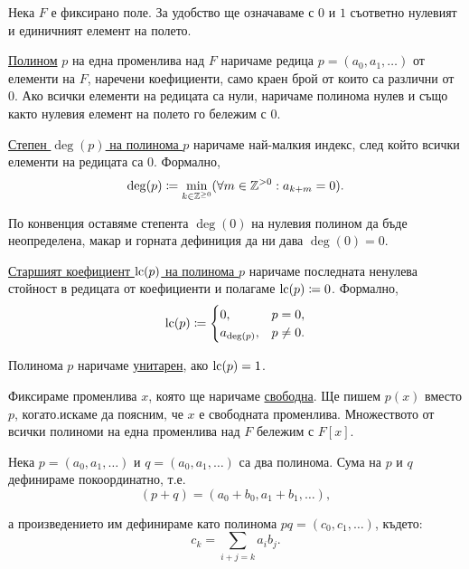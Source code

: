 \documentclass[numbers=endperiod, DIV=15]{scrartcl}
\begin{document}
Нека $F$ е фиксирано поле. За удобство ще означаваме с $0$ и $1$ съответно нулевият и единичният елемент на полето.

\begin{definition}
  \underline{Полином} $p$ на една променлива над $F$ наричаме редица $p = (a_0, a_1, \ldots)$ от елементи на $F$, наречени коефициенти, само краен брой от които са различни от $0$. Ако всички елементи на редицата са нули, наричаме полинома нулев и също както нулевия елемент на полето го бележим с $0$.

  \underline{Степен $\deg(p)$ на полинома $p$} наричаме най-малкия индекс, след който всички елементи на редицата са $0$. Формално,
  \begin{displaymath}
    \deg(p) \coloneqq \min_{k \in \mathbb{Z}^{\geq 0}} (\forall m \in \mathbb{Z}^{> 0} : a_{k + m} = 0).
  \end{displaymath}

  По конвенция оставяме степента $\deg(0)$ на нулевия полином да бъде неопределена, макар и горната дефиниция да ни дава $\deg(0) = 0$.

  \underline{Старшият коефициент $\operatorname{lc}(p)$ на полинома $p$} наричаме последната ненулева стойност в редицата от коефициенти и полагаме $\operatorname{lc}(p) \coloneqq 0$. Формално,
  \begin{displaymath}
    \operatorname{lc}(p) \coloneqq
    \begin{cases}
      0, &p = 0, \\
      a_{\deg(p)}, &p \neq 0.
    \end{cases}
  \end{displaymath}

  Полинома $p$ наричаме \underline{унитарен}, ако $\operatorname{lc}(p) = 1$.
\end{definition}

Фиксираме променлива $x$, която ще наричаме \underline{свободна}.
Ще пишем $p(x)$ вместо $p$, когато.искаме да поясним, че $x$ е свободната променлива. Множеството от всички полиноми на една променлива над $F$ бележим с $F[x]$.

Нека $p = (a_0, a_1, \ldots)$ и $q = (a_0, a_1, \ldots)$ са два полинома. Сума на $p$ и $q$ дефинираме покоординатно, т.е.
\begin{displaymath}
  (p + q) = (a_0 + b_0, a_1 + b_1, \ldots),
\end{displaymath}

а произведението им дефинираме като полинома $pq = (c_0, c_1, \ldots)$, където:
\begin{displaymath}
  c_k = \sum_{i+j=k} a_i b_j.
\end{displaymath}
\end{document}

